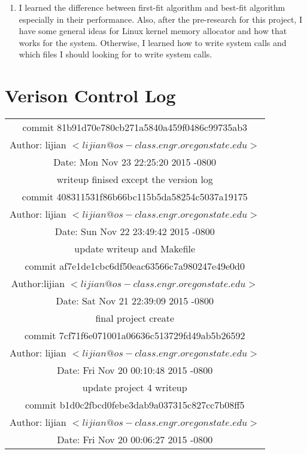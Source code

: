 \documentclass[letterpaper,11pt,titlepage]{article}
\begin{document}
\begin{enumerate}
\item I learned the difference between first-fit algorithm and best-fit algorithm especially in their performance. Also, after the pre-research for this project, I have some general ideas for Linux kernel memory allocator and how that works for the system. Otherwise, I learned how to write system calls and which files I should looking for to write system calls. 

\end{enumerate} 


\section{Verison Control Log}

\begin{table}[!hbp]
\begin{tabular}{|c|}

\hline
commit 81b91d70e780cb271a5840a459f0486c99735ab3\\
Author: lijian $<lijian@os-class.engr.oregonstate.edu>$\\
Date:   Mon Nov 23 22:25:20 2015 -0800\\

    writeup finised except the version log\\
\hline
commit 408311531f86b66bc115b5da58254c5037a19175\\
Author: lijian $<lijian@os-class.engr.oregonstate.edu>$\\
Date:   Sun Nov 22 23:49:42 2015 -0800\\

    update writeup and Makefile\\
\hline
commit af7e1de1cbc6df50eac63566c7a980247e49e0d0\\
Author:lijian $<lijian@os-class.engr.oregonstate.edu>$\\
Date:   Sat Nov 21 22:39:09 2015 -0800\\

    final project create\\
\hline
commit 7cf71f6e071001a06636c513729fd49ab5b26592\\
Author: lijian $<lijian@os-class.engr.oregonstate.edu>$\\
Date:   Fri Nov 20 00:10:48 2015 -0800\\

    update project 4 writeup\\
\hline	
commit b1d0c2fbcd0febe3dab9a037315c827cc7b08ff5\\
Author: lijian $<lijian@os-class.engr.oregonstate.edu>$\\
Date:   Fri Nov 20 00:06:27 2015 -0800\\


\end{tabular}
\end{table}
\end{document}
